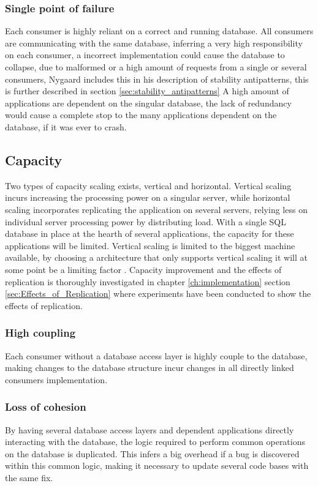 \subsubsection{Single point of failure}
Each consumer is highly reliant on a correct and running database. All consumers are communicating with the same database, inferring a very high responsibility on each consumer, a incorrect implementation could cause the database to collapse, due to malformed or a high amount of requests from a single or several consumers, Nygaard includes this in his description of stability antipatterns\cite[p. 31]{nygard2007release}, this is further described in section \ref{sec:stability_antipatterns}
A high amount of applications are dependent on the singular database, the lack of redundancy would cause a complete stop to the many applications dependent on the database, if it was ever to crash.

\subsection{Capacity}
Two types of capacity scaling exists, vertical and horizontal. Vertical scaling incurs increasing the processing power on a singular server, while horizontal scaling incorporates replicating the application on several servers, relying less on individual server processing power by distributing load. With a single SQL database in place at the hearth of several applications, the capacity for these applications will be limited. Vertical scaling is limited to the biggest machine available, by choosing a architecture that only supports vertical scaling it will at some point be a limiting factor \cite{meshenberg2016microservices}.
Capacity improvement and the effects of replication is thoroughly investigated in chapter \ref{ch:implementation} section \ref{sec:Effects_of_Replication} where experiments have been conducted to show the effects of replication.

\subsubsection{High coupling}
Each consumer without a database access layer is highly couple to the database, making changes to the database structure incur changes in all directly linked consumers implementation.

\subsubsection{Loss of cohesion}
By having several database access layers and dependent applications directly interacting with the database, the logic required to perform common operations on the database is duplicated. This infers a big overhead if a bug is discovered within this common logic, making it necessary to update several code bases with the same fix.

